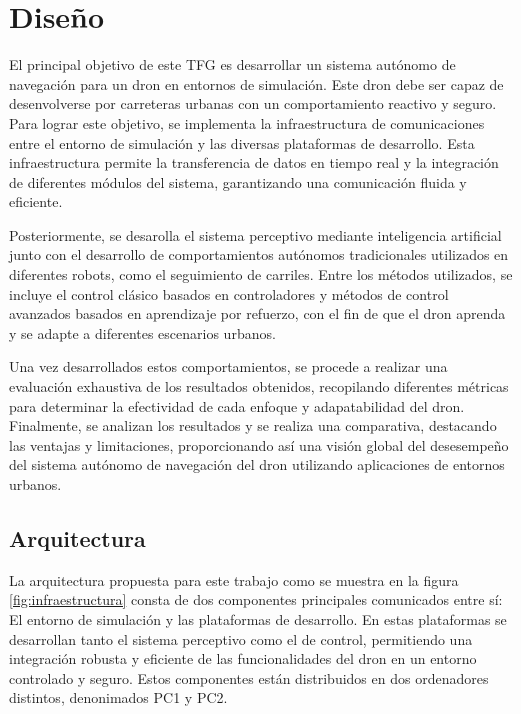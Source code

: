 \chapter{Diseño}
\label{cap:capitulo4}


\vspace{1cm}
El principal objetivo de este TFG es desarrollar un sistema autónomo de navegación para un dron en entornos de simulación. Este dron debe ser capaz de desenvolverse
por carreteras urbanas con un comportamiento reactivo y seguro. 
Para lograr este objetivo, se implementa la infraestructura de comunicaciones entre el entorno de simulación y las diversas 
plataformas de desarrollo. Esta infraestructura permite la transferencia de datos en tiempo real y la integración de diferentes módulos del sistema, garantizando 
una comunicación fluida y eficiente.

Posteriormente, se desarolla el sistema perceptivo mediante inteligencia artificial junto con el desarrollo de comportamientos autónomos tradicionales utilizados en diferentes robots, como el seguimiento de carriles. Entre los métodos utilizados, se incluye 
el control clásico basados en controladores y métodos de control avanzados basados en aprendizaje por refuerzo, con el fin de que el dron aprenda y se 
adapte a diferentes escenarios urbanos. 

Una vez desarrollados estos comportamientos, se procede a realizar una evaluación exhaustiva de los resultados obtenidos, 
recopilando diferentes métricas para determinar la efectividad de cada enfoque y adapatabilidad del dron. 
Finalmente, se analizan los resultados y se realiza una comparativa, destacando las ventajas y limitaciones, proporcionando así una visión global del desesempeño del sistema autónomo 
de navegación del dron utilizando aplicaciones de entornos urbanos. 


\section{Arquitectura}
\label{sec:Arquitectura}

La arquitectura propuesta para este trabajo como se muestra en la figura \ref{fig:infraestructura} consta de dos componentes principales 
comunicados entre sí: El entorno de simulación  y las plataformas de desarrollo. En estas plataformas se desarrollan tanto el sistema perceptivo 
como el de control, permitiendo una integración robusta y eficiente de las funcionalidades del dron en un entorno controlado y seguro. Estos componentes 
están distribuidos en dos ordenadores distintos, denonimados PC1 y PC2. 

